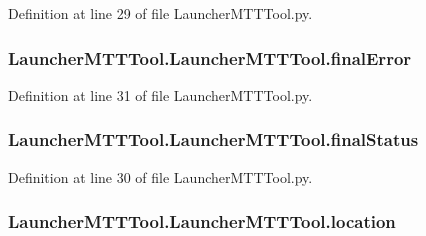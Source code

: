 Definition at line 29 of file Launcher\-M\-T\-T\-Tool.\-py.

\hypertarget{class_launcher_m_t_t_tool_1_1_launcher_m_t_t_tool_a607ea8851059a23f64f5b1ef4590109e}{
\subsubsection[{final\-Error}]{\setlength{\rightskip}{0pt plus 5cm}Launcher\-M\-T\-T\-Tool.\-Launcher\-M\-T\-T\-Tool.\-final\-Error}}\label{class_launcher_m_t_t_tool_1_1_launcher_m_t_t_tool_a607ea8851059a23f64f5b1ef4590109e}


Definition at line 31 of file Launcher\-M\-T\-T\-Tool.\-py.

\hypertarget{class_launcher_m_t_t_tool_1_1_launcher_m_t_t_tool_a24a3038f22807231f60be1efd39f7bcb}{
\subsubsection[{final\-Status}]{\setlength{\rightskip}{0pt plus 5cm}Launcher\-M\-T\-T\-Tool.\-Launcher\-M\-T\-T\-Tool.\-final\-Status}}\label{class_launcher_m_t_t_tool_1_1_launcher_m_t_t_tool_a24a3038f22807231f60be1efd39f7bcb}


Definition at line 30 of file Launcher\-M\-T\-T\-Tool.\-py.

\hypertarget{class_launcher_m_t_t_tool_1_1_launcher_m_t_t_tool_a13b93dfdaa7c433967c808d9bf54dcf9}{
\subsubsection[{location}]{\setlength{\rightskip}{0pt plus 5cm}Launcher\-M\-T\-T\-Tool.\-Launcher\-M\-T\-T\-Tool.\-location}}\label{class_launcher_m_t_t_tool_1_1_launcher_m_t_t_tool_a13b93dfdaa7c433967c808d9bf54dcf9}


